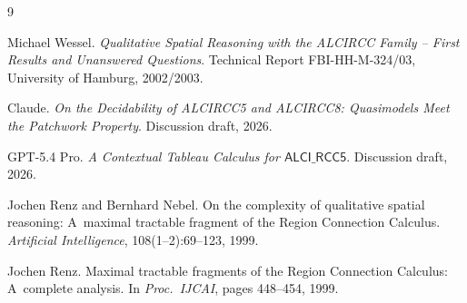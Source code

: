 \documentclass[11pt]{article}
\theoremstyle{definition}
\newcommand{\ALCIRCC}{\mathsf{ALCI\_RCC5}}
\begin{document}
\begin{thebibliography}{9}

Michael Wessel.
\newblock \emph{Qualitative Spatial Reasoning with the ALCIRCC Family
  -- First Results and Unanswered Questions}.
\newblock Technical Report FBI-HH-M-324/03, University of Hamburg,
  2002/2003.

Claude.
\newblock \emph{On the Decidability of ALCIRCC5 and ALCIRCC8:
  Quasimodels Meet the Patchwork Property}.
\newblock Discussion draft, 2026.

GPT-5.4 Pro.
\newblock \emph{A Contextual Tableau Calculus for $\ALCIRCC$}.
\newblock Discussion draft, 2026.

Jochen Renz and Bernhard Nebel.
\newblock On the complexity of qualitative spatial reasoning:
  A~maximal tractable fragment of the Region Connection Calculus.
\newblock \emph{Artificial Intelligence}, 108(1--2):69--123, 1999.

Jochen Renz.
\newblock Maximal tractable fragments of the Region Connection
  Calculus: A~complete analysis.
\newblock In \emph{Proc.\ IJCAI}, pages 448--454, 1999.

\end{thebibliography}
\end{document}
